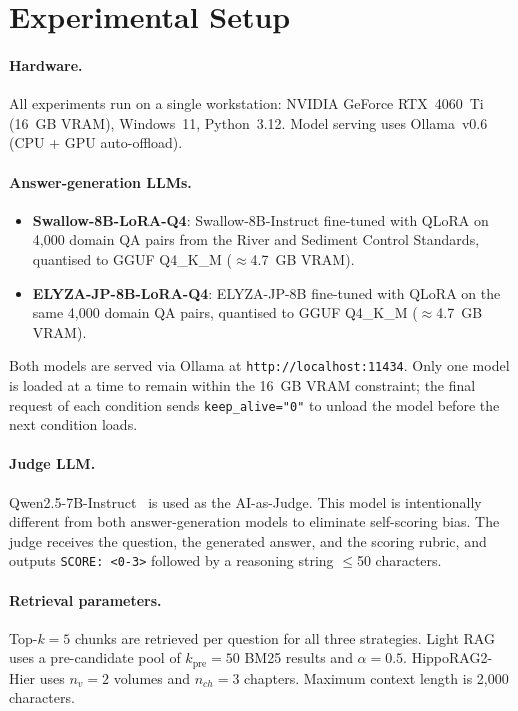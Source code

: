 \documentclass[twocolumn]{article}
\begin{document}
\section{Experimental Setup}
\label{sec:experiments}

\paragraph{Hardware.}
All experiments run on a single workstation:
NVIDIA GeForce RTX~4060~Ti (16~GB VRAM), Windows~11, Python~3.12.
Model serving uses Ollama~v0.6 (CPU + GPU auto-offload).

\paragraph{Answer-generation LLMs.}
\begin{itemize}
  \item \textbf{Swallow-8B-LoRA-Q4}: Swallow-8B-Instruct fine-tuned with QLoRA
        on 4,000 domain QA pairs from the River and Sediment Control Standards,
        quantised to GGUF Q4\_K\_M ($\approx$4.7~GB VRAM).
  \item \textbf{ELYZA-JP-8B-LoRA-Q4}: ELYZA-JP-8B fine-tuned with QLoRA
        on the same 4,000 domain QA pairs, quantised to GGUF Q4\_K\_M ($\approx$4.7~GB VRAM).
\end{itemize}
Both models are served via Ollama at \texttt{http://localhost:11434}.
Only one model is loaded at a time to remain within the 16~GB VRAM constraint;
the final request of each condition sends \texttt{keep\_alive="0"} to
unload the model before the next condition loads.

\paragraph{Judge LLM.}
Qwen2.5-7B-Instruct~\cite{qwen2025qwen25} is used as the AI-as-Judge.
This model is intentionally different from both answer-generation models
to eliminate self-scoring bias.
The judge receives the question, the generated answer, and the scoring rubric,
and outputs \texttt{SCORE: <0-3>} followed by a reasoning string $\leq$50 characters.

\paragraph{Retrieval parameters.}
Top-$k = 5$ chunks are retrieved per question for all three strategies.
Light RAG uses a pre-candidate pool of $k_{\mathrm{pre}} = 50$ BM25 results
and $\alpha = 0.5$.
HippoRAG2-Hier uses $n_v = 2$ volumes and $n_{ch} = 3$ chapters.
Maximum context length is 2,000 characters.
\end{document}

